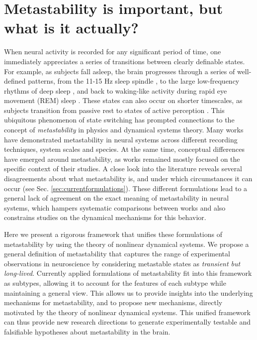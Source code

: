 \documentclass[reprint,superscriptaddress,showpacs,amsmath,amssymb,aps,floatfix,nolongbibliography]{revtex4-2}
\theoremstyle{definition}
\begin{document}
\maketitle

\section{Metastability is important, but what is it actually?}
When neural activity is recorded for any significant period of time, one immediately appreciates a series of transitions between clearly definable states. For example, as subjects fall asleep, the brain progresses through a series of well-defined patterns, from the 11-15 Hz sleep spindle \cite{contreras1996control}, to the large low-frequency rhythms of deep sleep \cite{steriade1993thalamocortical}, and back to waking-like activity during rapid eye movement (REM) sleep \cite{jouvet1979does}. These states can also occur on shorter timescales, as subjects transition from passive rest to states of active perception \cite{poulet2008internal}. This ubiquitous phenomenon of state switching has prompted connections to the concept of \textit{metastability} in physics and dynamical systems theory. Many works have demonstrated metastability in neural systems \cite{michel2017eeg, vandeville2010eeg, lehmann1987eeg, jones2007natural, lacamera2019cortical, mazzucato2019expectation, recanatesi2021metastable, brinkman2022metastable, abeles1995cortical, seidemann1996simultaneously, jercog2017updown, luczak2007sequential, mazor2005transient, sasaki2007metastability, mashour2020conscious, dehaene2005ongoing, hudson2014recovery, tognoli2014metastable, popa2009constracting, curtis2015initiation, fernandez2020sleep, caruso2023single, lang2023temporal} across different recording techniques, system scales and species.
At the same time, conceptual differences have emerged around metastability, as works remained mostly focused on the specific context of their studies. A close look into the literature reveals several disagreements about what metastability is, and under which circumstances it can occur (see Sec. \ref{sec:currentformulations}). These different formulations lead to a general lack of agreement on the exact meaning of metastability in neural systems, which hampers systematic comparisons between works and also constrains studies on the dynamical mechanisms for this behavior.

Here we present a rigorous framework that unifies these formulations of metastability by using the theory of nonlinear dynamical systems.
We propose a general definition of metastability that captures the range of experimental observations in neuroscience by considering metastable states as \textit{transient but long-lived}. Currently applied formulations of metastability fit into this framework as subtypes, allowing it to account for the features of each subtype while maintaining a general view. This allows us to provide insights into the underlying mechanisms for metastability, and to propose new mechanisms, directly motivated by the theory of nonlinear dynamical systems. This unified framework can thus provide new research directions to generate experimentally testable and falsifiable hypotheses about metastability in the brain.
\end{document}
